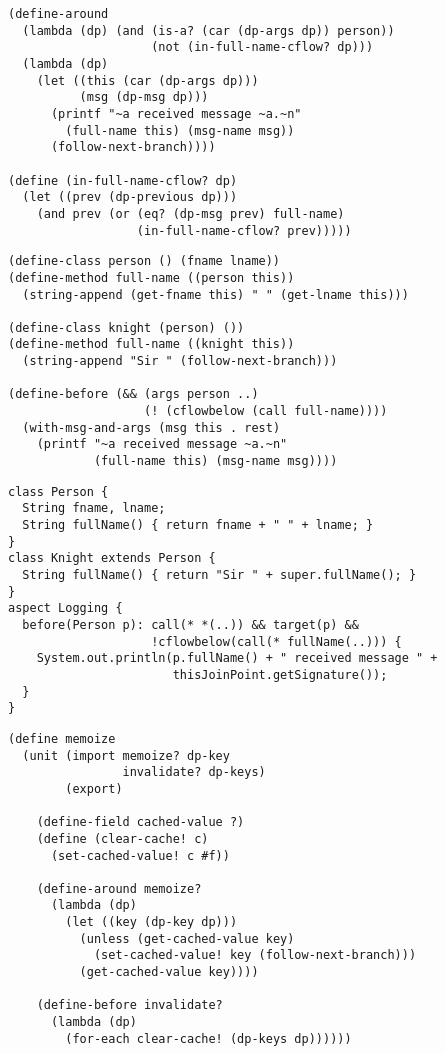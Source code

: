 \documentclass[landscape]{slides}
\begin{document}
\begin{slide}
\begin{verbatim}
(define-around
  (lambda (dp) (and (is-a? (car (dp-args dp)) person))
                    (not (in-full-name-cflow? dp)))
  (lambda (dp)
    (let ((this (car (dp-args dp)))
          (msg (dp-msg dp)))
      (printf "~a received message ~a.~n"
        (full-name this) (msg-name msg))
      (follow-next-branch))))

(define (in-full-name-cflow? dp)
  (let ((prev (dp-previous dp)))
    (and prev (or (eq? (dp-msg prev) full-name)
                  (in-full-name-cflow? prev)))))
\end{verbatim}
\end{slide}

\begin{slide}
\begin{verbatim}
(define-class person () (fname lname))
(define-method full-name ((person this))
  (string-append (get-fname this) " " (get-lname this)))

(define-class knight (person) ())
(define-method full-name ((knight this))
  (string-append "Sir " (follow-next-branch)))

(define-before (&& (args person ..)
                   (! (cflowbelow (call full-name))))
  (with-msg-and-args (msg this . rest)
    (printf "~a received message ~a.~n"
            (full-name this) (msg-name msg))))
\end{verbatim}
\end{slide}

\begin{slide}
\begin{verbatim}
class Person {
  String fname, lname;
  String fullName() { return fname + " " + lname; }
}
class Knight extends Person {
  String fullName() { return "Sir " + super.fullName(); }
}
aspect Logging {
  before(Person p): call(* *(..)) && target(p) &&
                    !cflowbelow(call(* fullName(..))) {
    System.out.println(p.fullName() + " received message " +
                       thisJoinPoint.getSignature());
  }
}
\end{verbatim}
\end{slide}

\begin{slide}
\small
\begin{verbatim}
(define memoize
  (unit (import memoize? dp-key
                invalidate? dp-keys)
        (export)

    (define-field cached-value ?)
    (define (clear-cache! c)
      (set-cached-value! c #f))

    (define-around memoize?
      (lambda (dp)
        (let ((key (dp-key dp)))
          (unless (get-cached-value key)
            (set-cached-value! key (follow-next-branch)))
          (get-cached-value key))))

    (define-before invalidate?
      (lambda (dp)
        (for-each clear-cache! (dp-keys dp))))))
\end{verbatim}
\end{slide}
\end{document}
